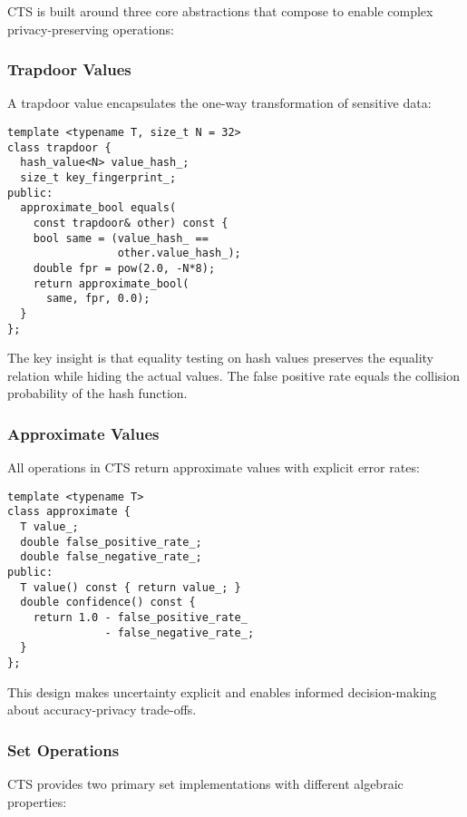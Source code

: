 \documentclass[10pt,conference]{IEEEtran}
\begin{document}
CTS is built around three core abstractions that compose to enable complex privacy-preserving operations:

\subsubsection{Trapdoor Values}

A trapdoor value encapsulates the one-way transformation of sensitive data:

\begin{lstlisting}[caption={Trapdoor value abstraction},label={lst:trapdoor}]
template <typename T, size_t N = 32>
class trapdoor {
  hash_value<N> value_hash_;
  size_t key_fingerprint_;
public:
  approximate_bool equals(
    const trapdoor& other) const {
    bool same = (value_hash_ ==
                 other.value_hash_);
    double fpr = pow(2.0, -N*8);
    return approximate_bool(
      same, fpr, 0.0);
  }
};
\end{lstlisting}

The key insight is that equality testing on hash values preserves the equality relation while hiding the actual values. The false positive rate equals the collision probability of the hash function.

\subsubsection{Approximate Values}

All operations in CTS return approximate values with explicit error rates:

\begin{lstlisting}[caption={Approximate value abstraction},label={lst:approximate}]
template <typename T>
class approximate {
  T value_;
  double false_positive_rate_;
  double false_negative_rate_;
public:
  T value() const { return value_; }
  double confidence() const {
    return 1.0 - false_positive_rate_
               - false_negative_rate_;
  }
};
\end{lstlisting}

This design makes uncertainty explicit and enables informed decision-making about accuracy-privacy trade-offs.

\subsubsection{Set Operations}

CTS provides two primary set implementations with different algebraic properties:
\end{document}
